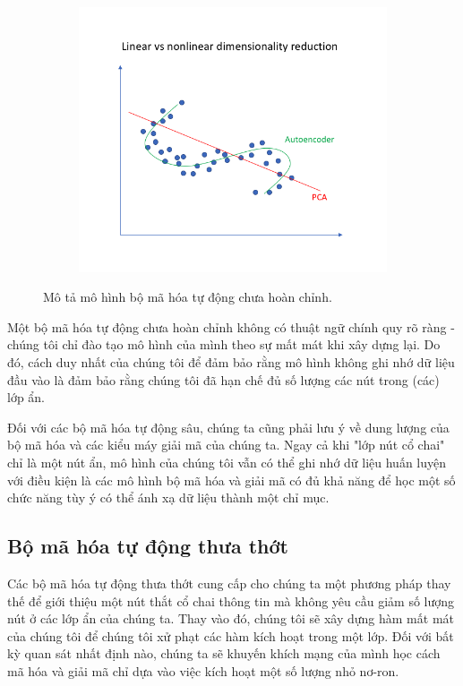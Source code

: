 \begin{figure}
    \begin{subfigure}{0.5\textwidth}
        \includegraphics[width=1.\linewidth]{Chapters/items/auto3.jpg}
        \caption{}
        \label{fig: auto3}
    \end{subfigure}
    \caption{Mô tả mô hình bộ mã hóa tự động chưa hoàn chỉnh.}
\end{figure}

Một bộ mã hóa tự động chưa hoàn chỉnh không có thuật ngữ chính quy
rõ ràng - chúng tôi chỉ đào tạo mô hình của mình theo sự mất mát
khi xây dựng lại. Do đó, cách duy nhất của chúng tôi để đảm bảo rằng
mô hình không ghi nhớ dữ liệu đầu vào là đảm bảo rằng chúng tôi đã
hạn chế đủ số lượng các nút trong (các) lớp ẩn.

Đối với các bộ mã hóa tự động sâu, chúng ta cũng phải lưu ý về dung
lượng của bộ mã hóa và các kiểu máy giải mã của chúng ta.
Ngay cả khi "lớp nút cổ chai" chỉ là một nút ẩn, mô hình của
chúng tôi vẫn có thể ghi nhớ dữ liệu huấn luyện với điều kiện là
các mô hình bộ mã hóa và giải mã có đủ khả năng để học một số chức
năng tùy ý có thể ánh xạ dữ liệu thành một chỉ mục.

\subsection{Bộ mã hóa tự động thưa thớt}

Các bộ mã hóa tự động thưa thớt cung cấp cho chúng ta một phương pháp
thay thế để giới thiệu một nút thắt cổ chai thông tin mà không
yêu cầu giảm số lượng nút ở các lớp ẩn của chúng ta. Thay vào đó,
chúng tôi sẽ xây dựng hàm mất mát của chúng tôi để chúng tôi
xử phạt các hàm kích hoạt trong một lớp. Đối với bất kỳ quan sát
nhất định nào, chúng ta sẽ khuyến khích mạng của mình học cách mã hóa và
giải mã chỉ dựa vào việc kích hoạt một số lượng nhỏ nơ-ron.

